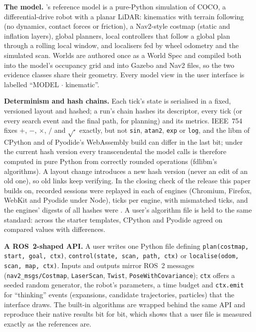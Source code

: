 \textbf{The model.} \cocolab{}'s reference model is a pure-Python simulation of COCO, a
differential-drive robot with a planar LiDAR: kinematics with terrain following (no dynamics,
contact forces or friction), a Nav2-style costmap (static and inflation layers), global planners,
local controllers that follow a global plan through a rolling local window, and localisers fed
by wheel odometry and the simulated scan. Worlds are authored once as a World Spec and compiled
both into the model's occupancy grid and into Gazebo and Nav2 files, so the two evidence classes
share their geometry. Every model view in the user interface is labelled ``MODEL $\cdot$
kinematic''.

\textbf{Determinism and hash chains.} Each tick's state is serialised in a fixed, versioned
layout and hashed; a run's chain hashes its descriptor, every tick (or every search event and the
final path, for planning) and its metrics. IEEE~754 fixes $+$, $-$, $\times$, $/$ and
$\sqrt{\cdot}$ exactly, but not \texttt{sin}, \texttt{atan2}, \texttt{exp} or \texttt{log}, and
the libm of CPython and of Pyodide's WebAssembly build can differ in the last bit; under the
current hash version every transcendental the model calls is therefore computed in pure Python
from correctly rounded operations (fdlibm's algorithms). A layout change introduces a new hash
version (never an edit of an old one), so old links keep verifying.
In the closing check of the release this paper builds on, \DetSessionsPerEngine{} recorded
sessions were replayed in each of \DetEngines{} engines (Chromium, Firefox, WebKit and
Pyodide under Node), \DetTicksPerEngine{} ticks per engine, with \DetMismatches{} mismatched
ticks, and the engines' digests of all hashes were \DetDigests{}. A user's algorithm file is held
to the same standard: across the \ParityTemplates{} starter templates, CPython and Pyodide
agreed on \ParityValues{} compared values with \ParityDiffs{} differences.

\textbf{A ROS~2-shaped API.} A user writes one Python file defining
\texttt{plan(costmap, start, goal, ctx)}, \texttt{control(state, scan, path, ctx)} or
\texttt{localise(odom, scan, map, ctx)}. Inputs and outputs mirror ROS~2 messages
(\texttt{nav2\_msgs/Costmap}, \texttt{LaserScan}, \texttt{Twist},
\texttt{PoseWithCovariance}); \texttt{ctx} offers a seeded random generator, the robot's
parameters, a time budget and \texttt{ctx.emit} for ``thinking'' events (expansions, candidate
trajectories, particles) that the interface draws. The built-in algorithms are wrapped behind
the same API and reproduce their native results bit for bit, which shows that a user file is
measured exactly as the references are.

